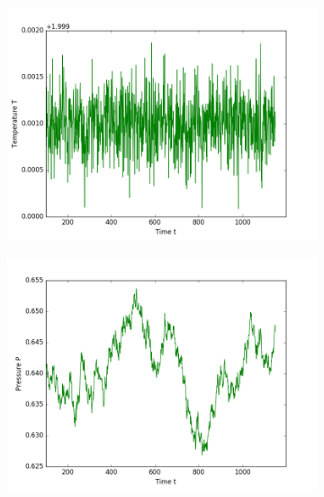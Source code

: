 \begin{figure}[ht]
\begin{subfigure}{0.3\textwidth}
\includegraphics[width=\textwidth]{fig/avTemperature_T2d0_F20d0_M100.png}
\end{subfigure}
\hfill
\begin{subfigure}{0.3\textwidth}
\includegraphics[width=\textwidth]{fig/avPressure_T2d0_F20d0_M100.png}
\end{subfigure}
\hfill
\begin{subfigure}{0.3\textwidth}

\end{subfigure}
\end{figure}
